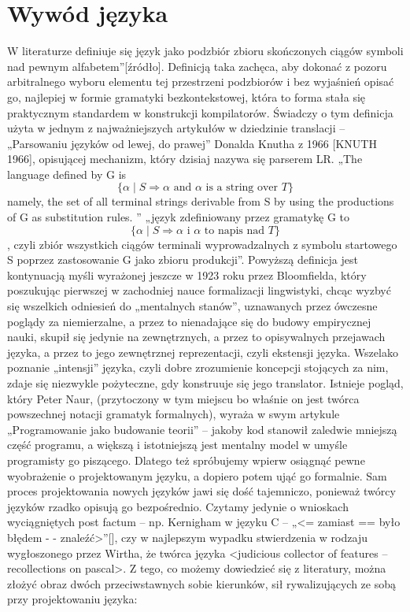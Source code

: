 \chapter{Wywód języka}
\label{cha:wywodJezyka}
W literaturze definiuje się język jako podzbiór zbioru skończonych ciągów symboli nad pewnym alfabetem”[źródło]. Definicją taka zachęca, aby dokonać z pozoru arbitralnego wyboru elementu tej przestrzeni podzbiorów i bez wyjaśnień opisać go, najlepiej w formie gramatyki bezkontekstowej, która to forma stała się praktycznym standardem w konstrukcji kompilatorów. Świadczy o tym definicja użyta w jednym z najważniejszych artykułów w dziedzinie translacji – „Parsowaniu języków od lewej, do prawej” Donalda Knutha z 1966 [KNUTH 1966], opisującej mechanizm, który dzisiaj nazywa się parserem LR. 
„The language defined by G is
\[
\{ \alpha \mid S \Rightarrow \alpha \text{ and } \alpha \text{ is a string over } T \}
\]
namely, the set of all terminal strings derivable from S by using the productions of G as substitution rules.  ”
„język zdefiniowany przez gramatykę G to \[
\{ \alpha \mid S \Rightarrow \alpha \text{ i } \alpha \text{ to napis nad } T \}
\], czyli zbiór wszystkich ciągów terminali wyprowadzalnych z symbolu startowego S poprzez zastosowanie G jako zbioru produkcji”.
Powyższą definicja jest kontynuacją myśli wyrażonej jeszcze w 1923 roku przez Bloomfielda, który poszukując pierwszej w zachodniej nauce formalizacji lingwistyki, chcąc wyzbyć się wszelkich odniesień do „mentalnych stanów”, uznawanych przez ówczesne poglądy za niemierzalne, a przez to nienadające się do budowy empirycznej nauki, skupił się jedynie na zewnętrznych, a przez to opisywalnych przejawach języka, a przez to jego zewnętrznej reprezentacji,  czyli ekstensji języka.
Wszelako poznanie „intensji” języka, czyli dobre zrozumienie koncepcji stojących za nim, zdaje się niezwykle pożyteczne, gdy konstruuje się jego translator. Istnieje pogląd, który Peter Naur, (przytoczony w tym miejscu bo właśnie on jest twórca powszechnej notacji gramatyk formalnych), wyraża w swym artykule „Programowanie jako budowanie teorii” – jakoby kod stanowił zaledwie mniejszą część programu, a większą i istotniejszą jest mentalny model w umyśle programisty go piszącego. Dlatego też spróbujemy wpierw osiągnąć pewne wyobrażenie o projektowanym języku, a dopiero potem ująć go formalnie. 
Sam proces projektowania nowych języków jawi się dość tajemniczo, ponieważ twórcy języków rzadko opisują go bezpośrednio. Czytamy jedynie o wnioskach wyciągniętych post factum – np. Kernigham w języku C – „<= zamiast == było błędem - - znaleźć>”[], czy w najlepszym wypadku stwierdzenia w rodzaju wygłoszonego przez Wirtha, że twórca języka <judicious collector of features – recollections on pascal>. Z tego, co możemy dowiedzieć się z literatury, można złożyć obraz dwóch przeciwstawnych sobie kierunków, sił rywalizujących ze sobą przy projektowaniu języka:
